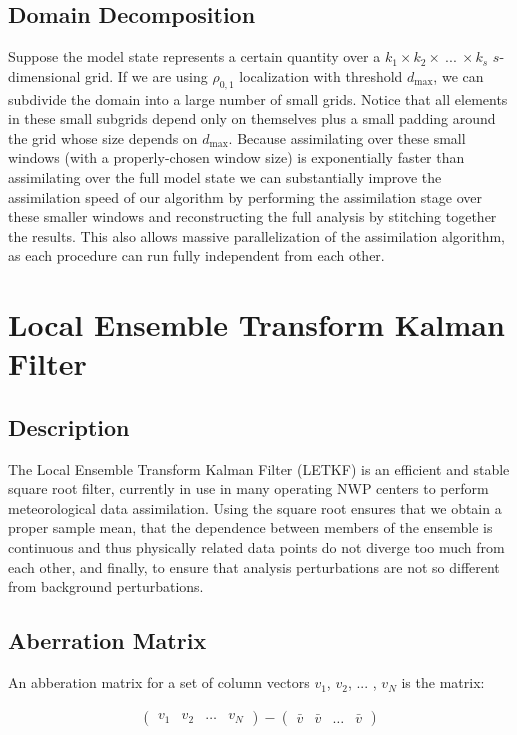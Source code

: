 \documentclass{article}
\begin{document}
\subsection{Domain Decomposition}

Suppose the model state represents a certain quantity over a $k_1 \times k_2 \times \: ... \: \times k_s$ $s$-dimensional grid. If we are using $\rho_{0, 1}$ localization with threshold $d_\text{max}$, we can subdivide the domain into a large number of small grids. Notice that all elements in these small subgrids depend only on themselves plus a small padding around the grid whose size depends on $d_\text{max}$. Because assimilating over these small windows (with a properly-chosen window size) is exponentially faster than assimilating over the full model state we can substantially improve the assimilation speed of our algorithm by performing the assimilation stage over these smaller windows and reconstructing the full analysis by stitching together the results. This also allows massive parallelization of the assimilation algorithm, as each procedure can run fully independent from each other.

\section{Local Ensemble Transform Kalman Filter}

\subsection{Description}

The Local Ensemble Transform Kalman Filter (LETKF) \cite{Hunt2007} is an efficient and stable square root filter, currently in use in many operating NWP centers to perform meteorological data assimilation. Using the square root ensures that we obtain a proper sample mean, that the dependence between members of the ensemble is continuous and thus physically related data points do not diverge too much from each other, and finally, to ensure that analysis perturbations are not so different from background perturbations.

\subsection{Aberration Matrix}

An abberation matrix for a set of column vectors $v_1$, $v_2$, ... , $v_N$ is the matrix:

\begin{gather*}
\begin{pmatrix}
v_1 & v_2 & \dots & v_N
\end{pmatrix} -
\begin{pmatrix}
\bar{v} & \bar{v} & \dots & \bar{v}
\end{pmatrix} \\
\end{gather*}
\end{document}

